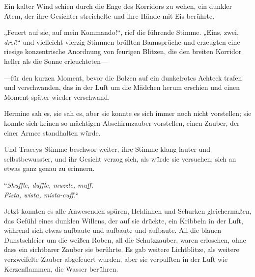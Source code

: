 Ein kalter Wind schien durch die Enge des Korridors zu wehen, ein dunkler Atem, der ihre Gesichter streichelte und ihre Hände mit Eis berührte.

„Feuert auf sie, auf mein Kommando!“, rief die führende Stimme.
„Eins, zwei, \emph{drei}!“ und vielleicht vierzig Stimmen brüllten Bannsprüche und erzeugten eine riesige konzentrische Anordnung von feurigen Blitzen, die den breiten Korridor heller als die Sonne erleuchteten—

—für den kurzen Moment, bevor die Bolzen auf ein dunkelrotes Achteck trafen und verschwanden, das in der Luft um die Mädchen herum erschien und einen Moment später wieder verschwand.

Hermine sah es, sie sah es, aber sie konnte es sich immer noch nicht vorstellen; sie konnte sich keinen so mächtigen Abschirmzauber vorstellen, einen Zauber, der einer Armee standhalten würde.

Und Traceys Stimme beschwor weiter, ihre Stimme klang lauter und selbstbewusster, und ihr Gesicht verzog sich, als würde sie versuchen, sich an etwas ganz genau zu erinnern.

“\emph{Shuffle, duffle, muzzle, muff.\\
Fista, wista, mista-cuff.}“

Jetzt konnten es alle Anwesenden spüren, Heldinnen und Schurken gleichermaßen, das Gefühl eines dunklen Willens, der auf sie drückte, ein Kribbeln in der Luft, während sich etwas aufbaute und aufbaute und aufbaute. All die blauen Dunstschleier um die weißen Roben, all die Schutzzauber, waren erloschen, ohne dass ein sichtbarer Zauber sie berührte. Es gab weitere Lichtblitze, als weitere verzweifelte Zauber abgefeuert wurden, aber sie verpufften in der Luft wie Kerzenflammen, die Wasser berühren.

